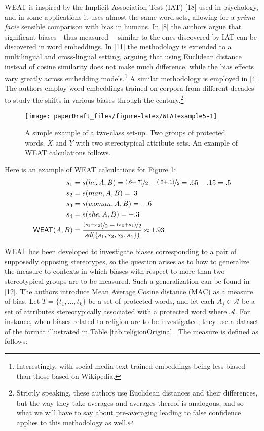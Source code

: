 \documentclass[
  12pt,
  dvipsnames,enabledeprecatedfontcommands]{scrartcl}
\begin{document}
\textsf{WEAT} is inspired by the Implicit Association Test (IAT)
{[}18{]} used in psychology, and in some applications it uses almost the
same word sets, allowing for a \emph{prima facie} sensible comparison
with bias in humans. In {[}8{]} the authors argue that significant
biases---thus measured--- similar to the ones discovered by IAT can be
discovered in word embeddings. In {[}11{]} the methodology is extended
to a multilingual and cross-lingual setting, arguing that using
Euclidean distance instead of cosine similarity does not make much
difference, while the bias effects vary greatly across embedding
models.\footnote{Interestingly, with social media-text trained
  embeddings being less biased than those based on Wikipedia.} A similar
methodology is employed in {[}4{]}. The authors employ word embeddings
trained on corpora from different decades to study the shifts in various
biases through the century.\footnote{Strictly speaking, these authors
  use Euclidean distances and their differences, but the way they take
  averages and averages thereof is analogous, and so what we will have
  to say about pre-averaging leading to false confidence applies to this
  methodology as well.}

\begin{figure}[H]

\begin{center}\texttt{[image: paperDraft\_files/figure-latex/WEATexample5-1]} \end{center}
\caption{A simple example of a two-class set-up. Two groups of protected words, $X$ and $Y$ with two stereotypical attribute sets. An example of \textsf{WEAT} calculations follows.}
\label{eq:WEATexample}
\end{figure}

\noindent Here is an example of \textsf{WEAT} calculations for Figure
\ref{eq:WEATexample}:
\begin{align*} s_1 & = s(he,A,B)  =  \nicefrac{(.6+.7)}{2}  - \nicefrac{(.2+.1)}{2} = .65-.15= .5 \\
s_2  & = s(man,A,B) = .3 \\
s_3  & = s(woman,A,B) = -.6\\
s_4 & = s(she, A, B) = -.3\\
\mathsf{WEAT}(A,B)  & = \frac{\nicefrac{(s_1+s_2)}{2} - \nicefrac{(s_3+s_4)}{2}}{sd(\{s_1,s_2,s_3,s_4\})} \approx 1.93
\end{align*}

\textsf{WEAT} has been developed to investigate biases corresponding to
a pair of supposedly opposing stereotypes, so the question arises as to
how to generalize the measure to contexts in which biases with respect
to more than two stereotypical groups are to be measured. Such a
generalization can be found in {[}12{]}. The authors introduce Mean
Average Cosine distance (\textsf{MAC}) as a measure of bias. Let
\(T = \{t_1, \dots, t_k\}\) be a set of protected words, and let each
\(A_j\in \mathcal{A}\) be a set of attributes stereotypically associated
with a protected word where \(\mathcal{A}\). For instance, when biases
related to religion are to be investigated, they use a dataset of the
format illustrated in Table \ref{tab:religionOriginal}. The measure is
defined as follows:
\end{document}
